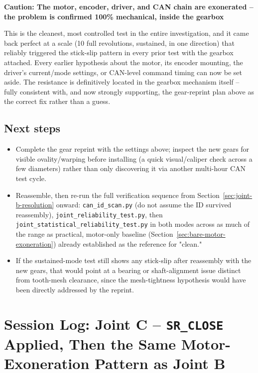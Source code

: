 \documentclass[11pt,letterpaper]{article}
\newenvironment{caution}[1]{%
    \par\addvspace{8pt}%
    \noindent{\color{cautionred}\rule{\linewidth}{0.8pt}}\par\vspace{2pt}
    \noindent\textbf{\color{cautionred}Caution: #1}\par\vspace{2pt}
}{%
    \par\vspace{2pt}\noindent{\color{cautionred}\rule{\linewidth}{0.4pt}}%
    \par\addvspace{8pt}%
}
\begin{document}
\begin{caution}{The motor, encoder, driver, and CAN chain are exonerated -- the problem is confirmed 100\% mechanical, inside the gearbox}
This is the cleanest, most controlled test in the entire investigation, and it came back perfect at a scale (10 full revolutions, sustained, in one direction) that reliably triggered the stick-slip pattern in every prior test with the gearbox attached. Every earlier hypothesis about the motor, its encoder mounting, the driver's current/mode settings, or CAN-level command timing can now be set aside. The resistance is definitively located in the gearbox mechanism itself -- fully consistent with, and now strongly supporting, the gear-reprint plan above as the correct fix rather than a guess.
\end{caution}

\subsection{Next steps}
\begin{itemize}
    \item Complete the gear reprint with the settings above; inspect the new gears for visible ovality/warping before installing (a quick visual/caliper check across a few diameters) rather than only discovering it via another multi-hour CAN test cycle.
    \item Reassemble, then re-run the full verification sequence from Section~\ref{sec:joint-b-resolution} onward: \texttt{can\_id\_scan.py} (do not assume the ID survived reassembly), \texttt{joint\_reliability\_test.py}, then \texttt{joint\_statistical\_reliability\_test.py} in both modes across as much of the range as practical, motor-only baseline (Section~\ref{sec:bare-motor-exoneration}) already established as the reference for "clean."
    \item If the sustained-mode test still shows any stick-slip after reassembly with the new gears, that would point at a bearing or shaft-alignment issue distinct from tooth-mesh clearance, since the mesh-tightness hypothesis would have been directly addressed by the reprint.
\end{itemize}

\section{Session Log: Joint C -- \texttt{SR\_CLOSE} Applied, Then the Same Motor-Exoneration Pattern as Joint B}
\label{sec:session-joint-c-followup}
\end{document}

